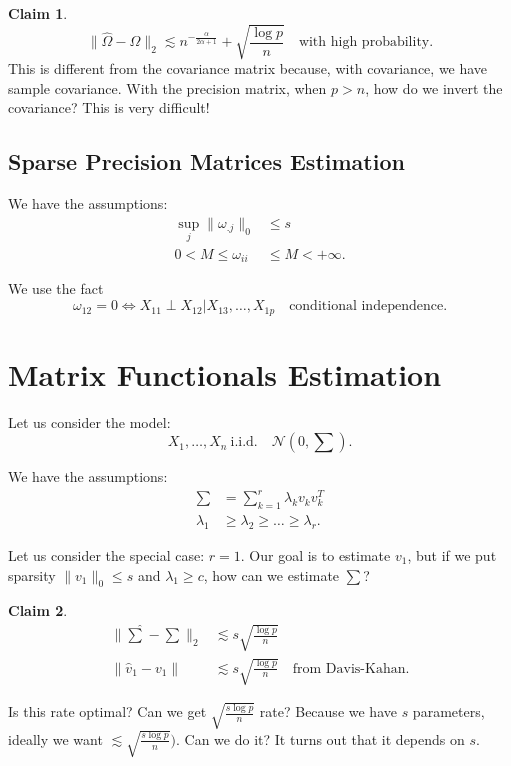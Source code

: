 \documentclass[twoside]{article}
\theoremstyle{definition}
\theoremstyle{definition}
\newtheorem*{claim}{Claim}
\theoremstyle{remark}
\begin{document}
\begin{claim}
\[
\| \hat\Omega - \Omega \|_2 \lesssim n^{-\frac{\alpha}{2\alpha + 1}} + \sqrt{\frac{\log p}{n}} \quad \text{with high probability}.
\]
This is different from the covariance matrix because, with covariance, we have sample covariance. With the precision matrix, when $p>n$, how do we invert the covariance? This is very difficult!
\end{claim}

\subsection{Sparse Precision Matrices Estimation}

We have the assumptions:
\[
\begin{aligned}
\sup \limits_j \| \omega_{.j} \|_0 &\leq s \\
0 < M \leq \omega_{ii} &\leq M < + \infty.
\end{aligned}
\]

We use the fact
\[
\omega_{12} = 0 \Leftrightarrow X_{11} \perp X_{12} | X_{13}, \ldots, X_{1p} \quad \text{conditional independence}.
\]

\section{Matrix Functionals Estimation}

Let us consider the model:
\[
X_1, \ldots, X_n \ \text{i.i.d.} \quad \mathcal{N}(0,\sum).
\]

We have the assumptions:
\[
\begin{aligned}
\sum &= \sum \limits_{k=1}^r \lambda_k v_k v_k^T \\
\lambda_1 &\geq \lambda_2 \geq \ldots \geq \lambda_r.
\end{aligned}
\]

Let us consider the special case: $r=1$. Our goal is to estimate $v_1$, but if we put sparsity $\|v_1\|_0 \leq s$ and $\lambda_1 \geq c$, how can we estimate $\sum$?

\begin{claim}
\[
\begin{aligned}
\| \widehat\sum - \sum \|_2 &\lesssim s \sqrt{\frac{\log p}{n}} \\
\| \hat v_1 - v_1 \| &\lesssim s \sqrt{\frac{\log p}{n}} \quad \text{from Davis-Kahan}.
\end{aligned}
\]

Is this rate optimal? Can we get $\sqrt{\frac{s \log p}{n}}$ rate? Because we have $s$ parameters, ideally we want $\lesssim \sqrt{\frac{s \log p}{n}})$. Can we do it? It turns out that it depends on $s$.
\end{claim}

\nocite{*}


\end{document}
